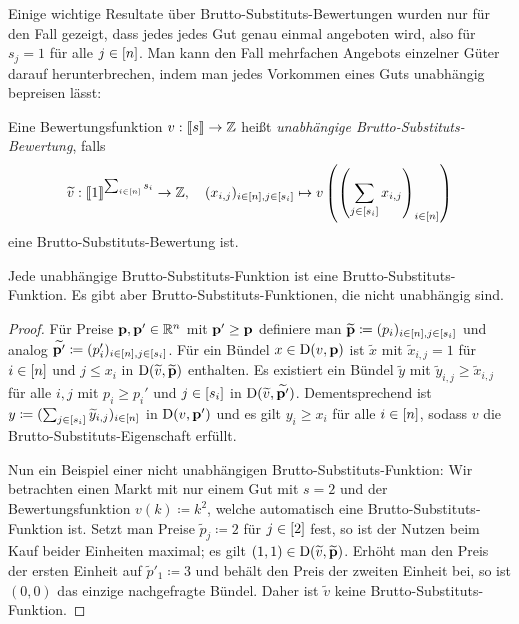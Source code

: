 Einige wichtige Resultate über Brutto-Substituts-Bewertungen wurden nur für den Fall gezeigt, dass jedes jedes Gut genau einmal angeboten wird, also für $s_j = 1$ für alle $j\in\left[ n \right]$.
Man kann den Fall mehrfachen Angebots einzelner Güter darauf herunterbrechen, indem man jedes Vorkommen eines Guts unabhängig bepreisen lässt:
\newcommand{\tild}[1]{\widetilde{#1}}
\begin{definition}
	Eine Bewertungsfunktion $v: \left\llbracket s \right\rrbracket \rightarrow \mathbb{Z}$ heißt \emph{unabhängige Brutto-Substituts-Bewertung}, falls \[
	\tild{v}: \ffirst{1}^{\sum_{i\in\first{n}}s_i} \rightarrow \Z,
	\quad (x_{i,j})_{i\in\first{n}, j\in\first{s_i}} \mapsto v\left( \left( \sum_{j\in\first{s_i}} x_{i,j} \right)_{i\in\first{n}} \right)
	\]
	eine Brutto-Substituts-Bewertung ist.
\end{definition}
\begin{proposition}
	Jede unabhängige Brutto-Substituts-Funktion ist eine Brutto-Substituts-Funktion.
	Es gibt aber Brutto-Substituts-Funktionen, die nicht unabhängig sind.
\end{proposition}
\begin{proof}
	Für Preise $\mathbf{p},\mathbf{p}'\in\mathbb{R}^n$ mit $\mathbf{p}' \geq \mathbf{p}$ definiere man $\tild{\fp}\coloneqq (p_i)_{i\in\first{n},j\in\first{s_i}}$ und analog $\tild{\fp'}\coloneqq (p_i')_{i\in\first{n},j\in\first{s_i}}$.
	Für ein Bündel $x\in\operatorname{D}(v,\mathbf{p})$ ist $\tild{x}$ mit $\tild{x}_{i,j} = 1$ für $i\in\left[ n \right]$ und $j\leq x_i$ in $\NB(\tild{v}, \tild{\fp})$ enthalten.
	Es existiert ein Bündel $\tild{y}$ mit $\tild{y}_{i,j} \geq \tild{x}_{i,j}$ für alle $i,j$ mit $p_i \geq p_i'$ und $j\in\left[ s_i \right]$ in $\NB(\tild{v}, \tild{\fp'})$.
	Dementsprechend ist $y\coloneqq(\sum_{j\in\first{s_i}} \tild{y}_{i,j})_{i\in\first{n}}$ in $\operatorname{D}(v, \mathbf{p}')$ und es gilt $y_i \geq x_i$ für alle $i\in\left[ n \right]$, sodass $v$ die Brutto-Substituts-Eigenschaft erfüllt.
	
	Nun ein Beispiel einer nicht unabhängigen Brutto-Substituts-Funktion: Wir betrachten einen Markt mit nur einem Gut mit $s=2$ und der Bewertungsfunktion $v(k)\coloneqq k^2$, welche automatisch eine Brutto-Substituts-Funktion ist.
	Setzt man Preise $\tild{p}_j \coloneqq 2$ für $j\in\left[ 2 \right]$ fest,
	so ist der Nutzen beim Kauf beider Einheiten maximal; es gilt $(1,1)\in \NB(\tild{v}, \tild{\fp})$.
	Erhöht man den Preis der ersten Einheit auf $\tild{p}'_1 \coloneqq 3$ und behält den Preis der zweiten Einheit bei, so ist $(0,0)$ das einzige nachgefragte Bündel.
	Daher ist $\tilde{v}$ keine Brutto-Substituts-Funktion.
\end{proof}

